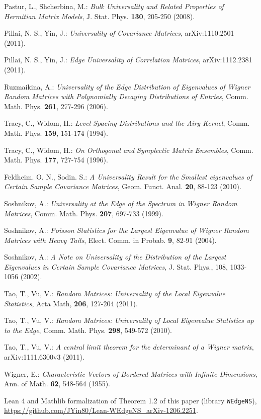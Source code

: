 \documentclass[reqno, 10pt]{amsart}
\theoremstyle{definition}
\theoremstyle{remark}
\numberwithin{equation}{section}
\numberwithin{thm}{section}
\begin{document}
\begin{thebibliography}{}
 Pastur, L., Shcherbina, M.: \emph{Bulk Universality and Related Properties of Hermitian Matrix Models}, J. Stat. Phys. \textbf{130}, 205-250 (2008).

 Pillai, N. S., Yin, J.: \emph{Universality of Covariance Matrices}, arXiv:1110.2501 (2011).

 Pillai, N. S., Yin, J.: \emph{Edge Universality of Correlation Matrices}, arXiv:1112.2381 (2011).

 Ruzmaikina, A.: \emph{Universality of the Edge Distribution of Eigenvalues of Wigner Random Matrices with Polynomially Decaying Distributions of Entries}, Comm. Math. Phys. \textbf{261}, 277-296 (2006).

 Tracy, C., Widom, H.: \emph{Level-Spacing Distributions and the Airy Kernel}, Comm. Math. Phys. \textbf{159}, 151-174 (1994).

 Tracy, C., Widom, H.: \emph{On Orthogonal and Symplectic Matrix Ensembles}, Comm. Math. Phys. \textbf{177}, 727-754 (1996).

 Feldheim. O. N., Sodin. S.: \emph{A Universality Result for the Smallest eigenvalues of Certain Sample Covariance Matrices}, Geom. Funct. Anal. \textbf{20}, 88-123 (2010).

 Soshnikov, A.: \emph{Universality at the Edge of the Spectrum in Wigner Random Matrices}, Comm. Math. Phys. \textbf{207}, 697-733 (1999).

 Soshnikov, A.: \emph{Poisson Statistics for the Largest Eigenvalue of Wigner Random Matrices with Heavy Tails}, Elect. Comm. in Probab. \textbf{9}, 82-91 (2004).

 Soshnikov, A.: \emph{A Note on Universality of the Distribution of the Largest Eigenvalues in Certain
Sample Covariance Matrices}, J. Stat. Phys., 108, 1033-1056 (2002).

 Tao, T., Vu, V.: \emph{Random Matrices: Universality of the Local Eigenvalue Statistics}, Acta Math, \textbf{206}, 127-204 (2011).

 Tao, T., Vu, V.: \emph{Random Matrices: Universality of Local Eigenvalue Statistics up to the Edge}, Comm. Math. Phys. \textbf{298}, 549-572 (2010).

 Tao, T., Vu, V.: \emph{A central limit theorem for the determinant of a Wigner matrix}, arXiv:1111.6300v3 (2011).

 Wigner, E.: \emph{Characteristic Vectors of Bordered Matrices with Infinite Dimensions}, Ann. of Math. \textbf{62}, 548-564 (1955).

 Lean 4 and Mathlib formalization of Theorem 1.2 of this paper (library \texttt{WEdgeNS}), \url{https://github.com/JYin80/Lean-WEdgeNS_arXiv-1206.2251}.

\end{thebibliography}
\end{document}
